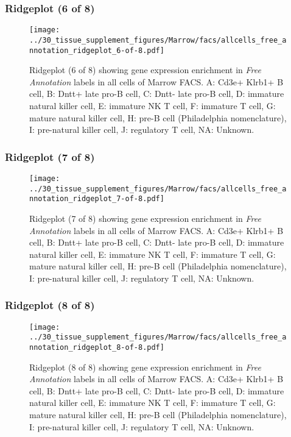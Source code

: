 \clearpage

\subsubsection{Ridgeplot (6 of 8)}
\begin{figure}[h]
\centering
\texttt{[image: ../30\_tissue\_supplement\_figures/Marrow/facs/allcells\_free\_annotation\_ridgeplot\_6-of-8.pdf]}

\caption{ Ridgeplot (6 of 8)  showing gene expression enrichment in \emph{Free Annotation} labels in all cells of Marrow FACS. A: Cd3e+ Klrb1+ B cell, B: Dntt+ late pro-B cell, C: Dntt- late pro-B cell, D: immature natural killer cell, E: immature NK T cell, F: immature T cell, G: mature natural killer cell, H: pre-B cell (Philadelphia nomenclature), I: pre-natural killer cell, J: regulatory T cell, NA: Unknown.}
\end{figure}


\clearpage

\subsubsection{Ridgeplot (7 of 8)}
\begin{figure}[h]
\centering
\texttt{[image: ../30\_tissue\_supplement\_figures/Marrow/facs/allcells\_free\_annotation\_ridgeplot\_7-of-8.pdf]}

\caption{ Ridgeplot (7 of 8)  showing gene expression enrichment in \emph{Free Annotation} labels in all cells of Marrow FACS. A: Cd3e+ Klrb1+ B cell, B: Dntt+ late pro-B cell, C: Dntt- late pro-B cell, D: immature natural killer cell, E: immature NK T cell, F: immature T cell, G: mature natural killer cell, H: pre-B cell (Philadelphia nomenclature), I: pre-natural killer cell, J: regulatory T cell, NA: Unknown.}
\end{figure}


\clearpage

\subsubsection{Ridgeplot (8 of 8)}
\begin{figure}[h]
\centering
\texttt{[image: ../30\_tissue\_supplement\_figures/Marrow/facs/allcells\_free\_annotation\_ridgeplot\_8-of-8.pdf]}

\caption{ Ridgeplot (8 of 8)  showing gene expression enrichment in \emph{Free Annotation} labels in all cells of Marrow FACS. A: Cd3e+ Klrb1+ B cell, B: Dntt+ late pro-B cell, C: Dntt- late pro-B cell, D: immature natural killer cell, E: immature NK T cell, F: immature T cell, G: mature natural killer cell, H: pre-B cell (Philadelphia nomenclature), I: pre-natural killer cell, J: regulatory T cell, NA: Unknown.}
\end{figure}


